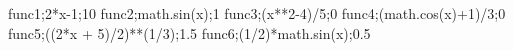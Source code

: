 func1;2*x-1;10
func2;math.sin(x);1
func3;(x**2-4)/5;0
func4;(math.cos(x)+1)/3;0
func5;((2*x + 5)/2)**(1/3);1.5
func6;(1/2)*math.sin(x);0.5